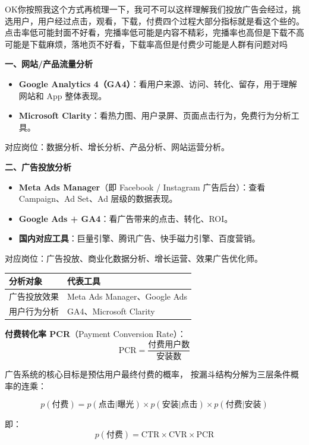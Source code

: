 \begin{dxtips}
    OK你按照我这个方式再梳理一下，我可不可以这样理解我们投放广告会经过，挑选用户，用户经过点击，观看，下载，付费四个过程大部分指标就是看这个些的。点击率低可能封面不好看，完播率低可能是内容不精彩，完播率也高但是下载不高可能是下载麻烦，落地页不好看，下载率高但是付费少可能是人群有问题对吗
\end{dxtips}
\begin{note}[广告分析常用工具]

\textbf{一、网站/产品流量分析}

\begin{itemize}
    \item \textbf{Google Analytics 4（GA4）}：看用户来源、访问、转化、留存，用于理解网站和 App 整体表现。
    \item \textbf{Microsoft Clarity}：看热力图、用户录屏、页面点击行为，免费行为分析工具。
\end{itemize}

对应岗位：数据分析、增长分析、产品分析、网站运营分析。

\textbf{二、广告投放分析}

\begin{itemize}
    \item \textbf{Meta Ads Manager}（即 Facebook / Instagram 广告后台）：查看 Campaign、Ad Set、Ad 层级的数据表现。
    \item \textbf{Google Ads + GA4}：看广告带来的点击、转化、ROI。
    \item \textbf{国内对应工具}：巨量引擎、腾讯广告、快手磁力引擎、百度营销。
\end{itemize}

对应岗位：广告投放、商业化数据分析、增长运营、效果广告优化师。

\begin{table}[h]
\centering
\begin{tabular}{ll}
\hline
\textbf{分析对象} & \textbf{代表工具} \\
\hline
广告投放效果 & Meta Ads Manager、Google Ads \\
用户行为分析 & GA4、Microsoft Clarity \\
\hline
\end{tabular}
\end{table}

\end{note}
\begin{definition}[付费转化率]

\textbf{付费转化率 PCR}（Payment Conversion Rate）：
$$\text{PCR} = \frac{\text{付费用户数}}{\text{安装数}}$$

\end{definition}
\begin{definition}[广告转化概率分解]

广告系统的核心目标是预估用户最终付费的概率，
按漏斗结构分解为三层条件概率的连乘：

$$p(\text{付费}) = p(\text{点击}|\text{曝光}) 
\times p(\text{安装}|\text{点击}) 
\times p(\text{付费}|\text{安装})$$

即：
$$p(\text{付费}) = \text{CTR} \times \text{CVR} \times \text{PCR}$$

\end{definition}

